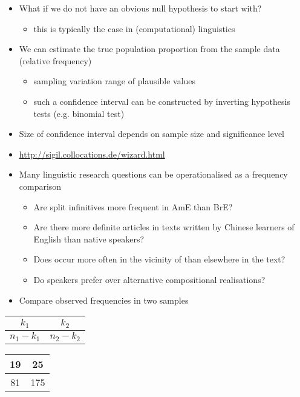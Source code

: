 \documentclass[a4paper,landscape,headrule,footrule,dvips]{foils}
\begin{document}
\begin{CJK}{UTF8}{min}
 \begin{itemize}
 \item What if we do not have an obvious    null hypothesis to start with?
   \begin{itemize}
 \item this is typically the case in (computational) linguistics
 \end{itemize}
\item We can estimate the true population proportion
from the sample data (relative frequency)
\begin{itemize}
\item sampling variation \into range of plausible values
\item such a confidence interval can be constructed by
inverting hypothesis tests (e.g. binomial test)
\end{itemize}
\item Size of confidence interval depends on sample
size and significance level
\item \url{http://sigil.collocations.de/wizard.html}
\end{itemize}


\begin{itemize}
\item Many linguistic research questions can be
operationalised as a frequency comparison
\begin{itemize}
\item Are split infinitives more frequent in AmE than BrE?
\item Are there more definite articles in texts written by
Chinese learners of English than native speakers?
\item Does  occur more often in the vicinity of 
than elsewhere in the text?
\item Do speakers prefer  over
alternative compositional realisations?
\end{itemize}
\item Compare observed frequencies in two samples
\end{itemize}



\begin{tabular}{|c|c|}
\hline
  $k_1 $ & $k_2 $ \\
\hline
  $n_1 - k_1 $ & $n_2 - k_2 $ \\
\hline
\end{tabular}
\begin{tabular}{|c|c|}
\hline
  19 & 25 \\
\hline
  81 & 175 \\ 
\hline
\end{tabular}


\end{CJK}
\end{document}
